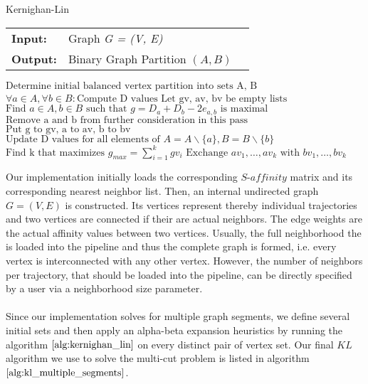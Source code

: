 \begin{algorithm}[H]
\caption{Kernighan-Lin}
\begin{table}[H]
  \begin{tabular}{@{}lll@{}}
    \textbf{Input:} & Graph \emph{G = (V, E)} \\
    \textbf{Output:} & Binary Graph Partition $\left( A, B \right)$ \\
  \end{tabular} 
\end{table}
\setlength{\fboxrule}{0pt} 
\begin{boxedminipage}{1.0\textwidth}
  \begin{algorithmic}[1]
  	  \State $\text{Determine initial balanced vertex partition into sets A, B}$
      \Do
		\State $\forall a \in A, \forall b \in B: \text{Compute D values}$
		\State $\text{Let gv, av, bv be empty lists}$
			\State $\text{Find } a \in A, b \in B \text{ such that } g = D_a + D_b - 2e_{a,b} \text{ is maximal}$
			\State $\text{Remove a and b from further consideration in this pass}$
			\State $\text{Put g to gv, a to av, b to bv}$
			\State $\text{Update D values for all elements of } A = A \backslash \{a\}, B = B \backslash \{b\}$
		\EndFor
		\State $\text{Find k that maximizes } g_{max} = \sum_{i=1}^k gv_i$
			\State $\text{Exchange } av_1,\dots, av_k \text{ with } bv_1,\dots, bv_k$  
		\EndIf	
  \end{algorithmic}
  \end{boxedminipage}
  \vskip1.5pt
\label{alg:kernighan_lin}
\end{algorithm}
Our implementation initially loads the corresponding $\textit{S-affinity}$ matrix and its corresponding nearest neighbor list. Then, an internal undirected graph $G = \left( V, E \right)$ is constructed. Its vertices represent thereby individual trajectories and two vertices are connected if their are actual neighbors. The edge weights are the actual affinity values between two vertices. Usually, the full neighborhood the is loaded into the pipeline and thus the complete graph is formed, i.e. every vertex is interconnected with any other vertex. However, the number of neighbors per trajectory, that should be loaded into the pipeline, can be directly specified by a user via a neighborhood size parameter. \\ \\
Since our implementation solves for multiple graph segments, we define several initial sets and then apply an alpha-beta expansion heuristics by running the algorithm $\ref{alg:kernighan_lin}$ on every distinct pair of vertex set. Our final $KL$ algorithm we use to solve the multi-cut problem is listed in algorithm $\ref{alg:kl_multiple_segments}$.
